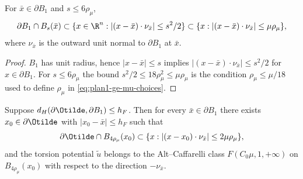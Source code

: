 \begin{lemma}
\label{lem:plan1-ge-slab}
For \(\bar x\in\partial B_1\) and \(s\le 6\rho_\mu\),
\[
   \partial B_1\cap B_s(\bar x)
   \subset\{x\in\R^n:|(x-\bar x)\cdot\nu_{\bar x}|\le s^2/2\}
   \subset\{x:|(x-\bar x)\cdot\nu_{\bar x}|\le\mu\rho_\mu\},
\]
where \(\nu_{\bar x}\) is the outward unit normal to \(\partial B_1\) at
\(\bar x\).
\end{lemma}

\begin{proof}
\(B_1\) has unit radius, hence \(|x-\bar x|\le s\) implies
\(|(x-\bar x)\cdot\nu_{\bar x}|\le s^2/2\) for \(x\in\partial B_1\). For
\(s\le 6\rho_\mu\) the bound \(s^2/2\le 18\rho_\mu^2\le\mu\rho_\mu\) is
the condition \(\rho_\mu\le\mu/18\) used to define \(\rho_\mu\) in
\eqref{eq:plan1-ge-mu-choices}.
\end{proof}

\begin{proposition}
\label{prop:plan1-ge-flatness}
Suppose \(d_H(\partial\Otilde,\partial B_1)\le h_F\). Then for every
\(\bar x\in\partial B_1\) there exists \(x_0\in\partial\Otilde\) with
\(|x_0-\bar x|\le h_F\) such that
\[
   \partial\Otilde\cap B_{4\rho_\mu}(x_0)
   \subset\{x:|(x-x_0)\cdot\nu_{\bar x}|\le 2\mu\rho_\mu\},
\]
and the torsion potential \(\widetilde u\) belongs to the Alt--Caffarelli
class \(F(C_0\mu,1,+\infty)\) on \(B_{4\rho_\mu}(x_0)\) with respect to
the direction \(-\nu_{\bar x}\).
\end{proposition}

